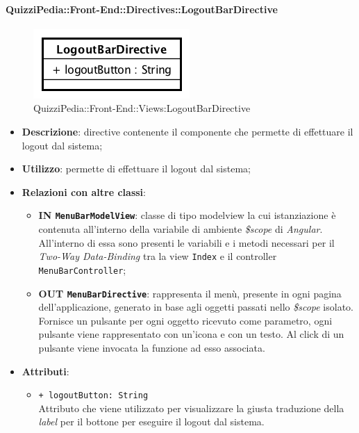 \paragraph{QuizziPedia::Front-End::Directives::LogoutBarDirective}

\label{QuizziPedia::Front-End::Directives::LogoutBarDirective}
\begin{figure} [ht]
	\centering
	\includegraphics[scale=0.80]{UML/Classi/Front-End/QuizziPedia_Front-end_Directives_LogoutBarDirective.png}
	\caption{QuizziPedia::Front-End::Views:LogoutBarDirective}
\end{figure} \FloatBarrier
\begin{itemize}
	\item \textbf{Descrizione}: directive contenente il componente che permette di effettuare il logout dal sistema;
	\item \textbf{Utilizzo}: permette di effettuare il logout dal sistema;
	\item \textbf{Relazioni con altre classi}:
	\begin{itemize}
		\item \textbf{IN \texttt{MenuBarModelView}}: classe di tipo modelview la cui istanziazione è contenuta all'interno della variabile di ambiente \textit{\$scope} di \textit{Angular}. All'interno di essa sono presenti le variabili e i metodi necessari per il \textit{Two-Way Data-Binding} tra la view \texttt{Index} e il controller \texttt{MenuBarController};
		\item \textbf{OUT \texttt{MenuBarDirective}}: rappresenta il menù, presente in ogni pagina dell'applicazione, generato in base agli oggetti passati nello \textit{\$scope} isolato. Fornisce un pulsante per ogni oggetto ricevuto come parametro, ogni pulsante viene rappresentato con un’icona e con un testo. Al click di un pulsante viene invocata la funzione ad esso associata.  
	\end{itemize}
	\item \textbf{Attributi}:
	\begin{itemize}
		\item \texttt{+ logoutButton: String} \\ Attributo che viene utilizzato per visualizzare la giusta traduzione della \textit{label} per il bottone per eseguire il logout dal sistema.
	\end{itemize}
\end{itemize}